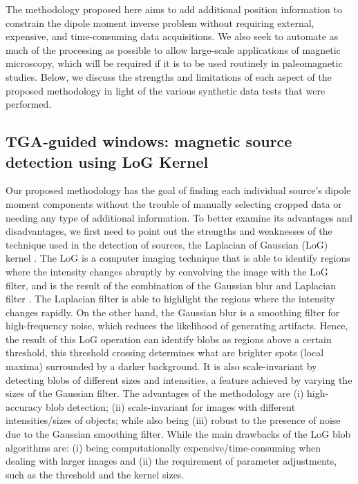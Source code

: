 The methodology proposed here aims to add additional position information to constrain the dipole moment inverse problem without requiring external, expensive, and time-consuming data acquisitions. We also seek to automate as much of the processing as possible to allow large-scale applications of magnetic microscopy, which will be required if it is to be used routinely in paleomagnetic studies.
Below, we discuss the strengths and limitations of each aspect of the proposed methodology in light of the various synthetic data tests that were performed.

\subsection{TGA-guided windows: magnetic source detection using LoG Kernel}

Our proposed methodology has the goal of finding each individual source’s dipole moment components without the trouble of manually selecting cropped data or needing any type of additional information.
To better examine its advantages and disadvantages, we first need to point out the strengths and weaknesses of the technique used in the detection of sources, the Laplacian of Gaussian (LoG) kernel \citep{Marr1980}.
The LoG is a computer imaging technique that is able to identify regions where the intensity changes abruptly by convolving the image with the LoG filter, and is the result of the combination of the Gaussian blur and Laplacian filter \citep{gonzalez2018}.
The Laplacian filter is able to highlight the regions where the intensity changes rapidly.
On the other hand, the Gaussian blur is a smoothing filter for high-frequency noise, which reduces the likelihood of generating artifacts.
Hence, the result of this LoG operation can identify blobs as regions above a certain threshold, this threshold crossing determines what are brighter spots (local maxima) surrounded by a darker background.
It is also scale-invariant by detecting blobs of different sizes and intensities, a feature achieved by varying the sizes of the Gaussian filter.
The advantages of the methodology are (i) high-accuracy blob detection; (ii) scale-invariant for images with different intensities/sizes of objects; while also being (iii) robust to the presence of noise due to the Gaussian smoothing filter.
While the main drawbacks of the LoG blob algorithms are: (i) being computationally expensive/time-consuming when dealing with larger images and (ii) the requirement of parameter adjustments, such as the threshold and the kernel sizes.

